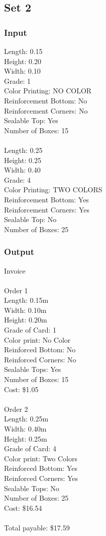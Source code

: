 \documentclass[12pt]{article}
\begin{document}
\subsection{Set 2}
\subsubsection{Input}
Length: 0.15\\
Height: 0.20\\
Width: 0.10\\
Grade: 1\\
Color Printing: NO COLOR\\
Reinforcement Bottom: No\\
Reinforcement Corners: No\\
Sealable Top: Yes\\
Number of Boxes: 15\\
\\
Length: 0.25\\
Height: 0.25\\
Width: 0.40\\
Grade: 4\\
Color Printing: TWO COLORS\\
Reinforcement Bottom: Yes\\
Reinforcement Corners: Yes\\
Sealable Top: No\\
Number of Boxes: 25\\
\subsubsection{Output}
Invoice\\
\\
Order 1\\
Length: 0.15m\\
Width: 0.10m\\
Height: 0.20m\\
Grade of Card: 1\\
Color print: No Color\\
Reinforced Bottom: No\\
Reinforced Corners: No\\
Sealable Tops: Yes\\
Number of Boxes: 15\\
Cost: \$1.05\\
\\
Order 2\\
Length: 0.25m\\
Width: 0.40m\\
Height: 0.25m\\
Grade of Card: 4\\
Color print: Two Colors\\
Reinforced Bottom: Yes\\
Reinforced Corners: Yes\\
Sealable Tops: No\\
Number of Boxes: 25\\
Cost: \$16.54\\
\\
Total payable: \$17.59\\
\end{document}
